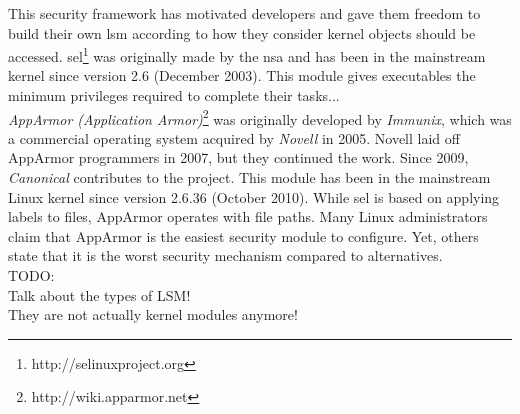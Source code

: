 \noindent
This security framework has motivated developers and gave them freedom to build their own \gls{lsm} according to how they consider kernel objects should be accessed. \gls{sel}\footnote{http://selinuxproject.org} was originally made by the \gls{nsa} and has been in the mainstream kernel since version 2.6 (December 2003). This module gives executables the minimum privileges required to complete their tasks...\\  

\noindent
\textit{AppArmor (Application Armor)}\footnote{http://wiki.apparmor.net} was originally developed by \textit{Immunix}, which was a commercial operating system acquired by \textit{Novell} in 2005. Novell laid off AppArmor programmers in 2007, but they continued the work. Since 2009, \textit{Canonical} contributes to the project. This module has been in the mainstream Linux kernel since version 2.6.36 (October 2010). While \gls{sel} is based on applying labels to files, AppArmor operates with file paths. Many Linux administrators claim that AppArmor is the easiest security module to configure. Yet, others state that it is the worst security mechanism compared to alternatives.\\



\noindent
TODO:\\
Talk about the types of LSM!\\
They are not actually kernel modules anymore!

